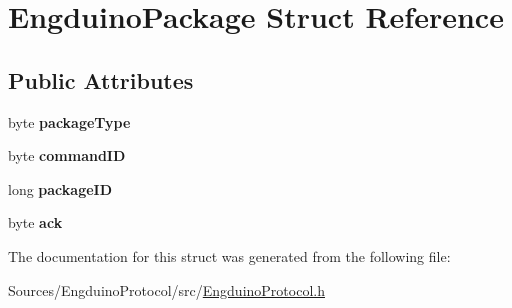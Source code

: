 \hypertarget{struct_engduino_package}{}\section{Engduino\+Package Struct Reference}
\label{struct_engduino_package}
\subsection*{Public Attributes}
\begin{DoxyCompactItemize}
\item 
\hypertarget{struct_engduino_package_a9e5e24441e2b6a0e035dd3f5ac4bd443}{}byte {\bfseries package\+Type}\label{struct_engduino_package_a9e5e24441e2b6a0e035dd3f5ac4bd443}

\item 
\hypertarget{struct_engduino_package_a1e950ecc18a8b9555d5599207f2c4ac8}{}byte {\bfseries command\+I\+D}\label{struct_engduino_package_a1e950ecc18a8b9555d5599207f2c4ac8}

\item 
\hypertarget{struct_engduino_package_a9ca8e97e29de1d23f418b6c9bdeed85f}{}long {\bfseries package\+I\+D}\label{struct_engduino_package_a9ca8e97e29de1d23f418b6c9bdeed85f}

\item 
\hypertarget{struct_engduino_package_a666bae5ca363e2384ece15b1a423ec60}{}byte {\bfseries ack}\label{struct_engduino_package_a666bae5ca363e2384ece15b1a423ec60}

\end{DoxyCompactItemize}


The documentation for this struct was generated from the following file\+:\begin{DoxyCompactItemize}
\item 
Sources/\+Engduino\+Protocol/src/\hyperlink{_engduino_protocol_8h}{Engduino\+Protocol.\+h}\end{DoxyCompactItemize}
